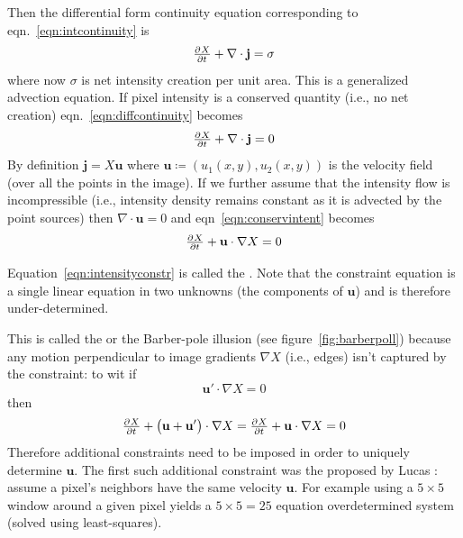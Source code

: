 Then the differential form continuity equation corresponding to eqn.~\eqref{eqn:intcontinuity} is
\begin{equation}
	\pd{X}{t} + \nabla \cdot \mathbf{j} = \sigma
	\label{eqn:diffcontinuity}
\end{equation}
where now \(\sigma\) is net intensity creation per unit area.
%
This is a generalized advection equation.
%
If pixel intensity is a conserved quantity (i.e., no net creation) eqn.~\eqref{eqn:diffcontinuity} becomes
\begin{equation}
	\pd{X}{t} + \nabla \cdot \mathbf{j} = 0
	\label{eqn:conservintent}
\end{equation}
By definition \(\mathbf{j} = X\mathbf{u}\) where \(\mathbf{u} \coloneqq (u_1(x,y), u_2(x,y))\) is the velocity field (over all the points in the image).
%
If we further assume that the intensity flow is incompressible (i.e., intensity density remains constant as it is advected by the point sources) then \(\nabla \cdot \mathbf{u} = 0\) and eqn~\eqref{eqn:conservintent} becomes
\begin{equation}
	\pd{X}{t} + \mathbf{u} \cdot \nabla X = 0
	\label{eqn:intensityconstr}
\end{equation}

Equation~\eqref{eqn:intensityconstr} is called the  \cite{perez2013tv}.
%
Note that the constraint equation is a single linear equation in two unknowns (the components of \(\mathbf{u}\)) and is therefore under-determined.
%

%
This is called the  or the Barber-pole illusion (see figure~\ref{fig:barberpoll}) because any motion perpendicular to image gradients \(\nabla X\) (i.e., edges) isn't captured by the constraint: to wit if
\[\mathbf{u}' \cdot \nabla X= 0\]
then
\[
	\pd{X}{t} + \left(\mathbf{u} + \mathbf{u}' \right) \cdot \nabla X = \pd{X}{t} + \mathbf{u} \cdot \nabla X = 0
\]
%
Therefore additional constraints need to be imposed in order to uniquely determine \(\mathbf{u}\).
%
The first such additional constraint was the  proposed by Lucas \etal \cite{lucas1981iterative}: assume a pixel's neighbors have the same velocity \(\mathbf{u}\).
%
For example using a \(5 \times 5\) window around a given pixel yields a \(5\times5 = 25\) equation overdetermined system (solved using least-squares).

